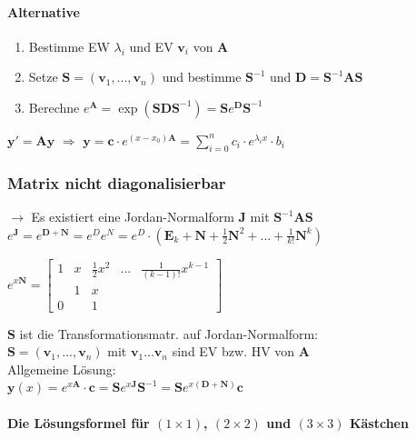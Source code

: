 \documentclass[6pt,a4paper]{scrartcl}
\newcommand{\mat}[1]{\ensuremath{\begin{bmatrix} #1 \end{bmatrix}}}                             %
\newcommand{\ma}[1]{\ensuremath{\boldsymbol {#1}}}                                              %
\renewcommand{\vec}[1]{\ensuremath{\boldsymbol {#1}}}                                           %
\newcommand{\Ra}[0]{\ensuremath{\Rightarrow}}                                  %
\newcommand{\ra}[0]{\ensuremath{\rightarrow}}                                  %
\begin{document}
\begin{multicols*}{4}
    \paragraph{Alternative}
    \begin{enumerate}
        \item Bestimme EW $\lambda_i$ und EV $\vec v_i$ von $\ma A$
        \item Setze $\ma S = (\vec v_1, ..., \vec v_n)$ und bestimme $\ma S^{-1}$ und $\ma D = \ma S^{-1} \ma A \ma S$
        \item Berechne $e^{\ma A} = \exp(\ma S \ma D \ma S^{-1}) = \ma S e^{\ma D} \ma S^{-1} $
    \end{enumerate}
    $\vec y' = \ma A \vec y$ \quad $\Ra$ \quad $\vec y = \vec c \cdot e^{(x-x_0)\ma A} = \sum\limits_{i = 0}^n c_i \cdot e^{\lambda_i x} \cdot b_i$\\

    \iffalse
        \subsubsection{Matrix nicht diagonalisierbar}
        $\ra$    Es existiert eine Jordan-Normalform $\ma J$ mit $\ma S^{-1} \ma A \ma S$\\


        $e^{\ma J} = e^{\ma D + \ma N} = e^{D} e^{N} = e^D \cdot (\ma E_k + \ma N + \frac{1}{2} \ma N^2 + ... + \frac{1}{k!} \ma N^k)$

        $e^{x\ma N} =  \mat{1 & x & \frac{1}{2} x^2 & ... & \frac{1}{(k-1)!} x^{k-1} \\ & 1 & x & & \\ 0 & & 1 & }$

        $\ma S$ ist die Transformationsmatr. auf Jordan-Normalform: \\
        $\ma S = (\vec v_1, ..., \vec v_n)$ mit $\vec v_1 \ldots \vec v_n$ sind EV bzw. HV von $\ma A$
        \\


        Allgemeine Lösung: \\
        $\boxed{\vec y(x) = e^{x \ma A} \cdot \vec c = \ma S e^{x \ma J} \ma S^{-1} = \ma S e^{x(\ma D + \ma N)} \vec c}$

        \paragraph{Die Lösungsformel für $(1 \times 1)$, $(2 \times 2)$ und $(3 \times 3)$ Kästchen}


\end{multicols*}
\end{document}

